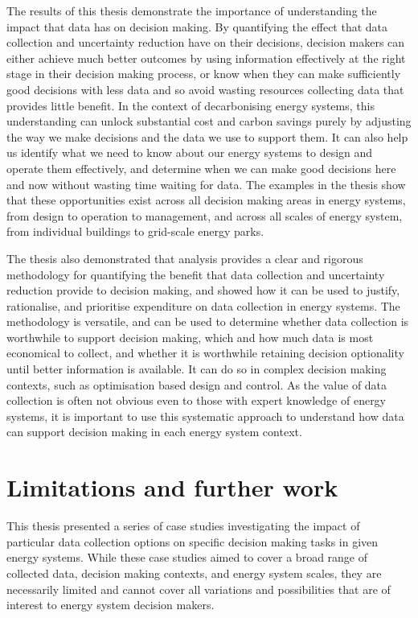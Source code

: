 The results of this thesis demonstrate the importance of understanding the impact that data has on decision making. By quantifying the effect that data collection and uncertainty reduction have on their decisions, decision makers can either achieve much better outcomes by using information effectively at the right stage in their decision making process, or know when they can make sufficiently good decisions with less data and so avoid wasting resources collecting data that provides little benefit. In the context of decarbonising energy systems, this understanding can unlock substantial cost and carbon savings purely by adjusting the way we make decisions and the data we use to support them. It can also help us identify what we need to know about our energy systems to design and operate them effectively, and determine when we can make good decisions here and now without wasting time waiting for data. The examples in the thesis show that these opportunities exist across all decision making areas in energy systems, from design to operation to management, and across all scales of energy system, from individual buildings to grid-scale energy parks.

The thesis also demonstrated that  analysis provides a clear and rigorous methodology for quantifying the benefit that data collection and uncertainty reduction provide to decision making, and showed how it can be used to justify, rationalise, and prioritise expenditure on data collection in energy systems. The methodology is versatile, and can be used to determine whether data collection is worthwhile to support decision making, which and how much data is most economical to collect, and whether it is worthwhile retaining decision optionality until better information is available. It can do so in complex decision making contexts, such as optimisation based design and control. As the value of data collection is often not obvious even to those with expert knowledge of energy systems, it is important to use this systematic approach to understand how data can support decision making in each energy system context.

\newpage
\section{Limitations and further work}

This thesis presented a series of case studies investigating the impact of particular data collection options on specific decision making tasks in given energy systems. While these case studies aimed to cover a broad range of collected data, decision making contexts, and energy system scales, they are necessarily limited and cannot cover all variations and possibilities that are of interest to energy system decision makers.

